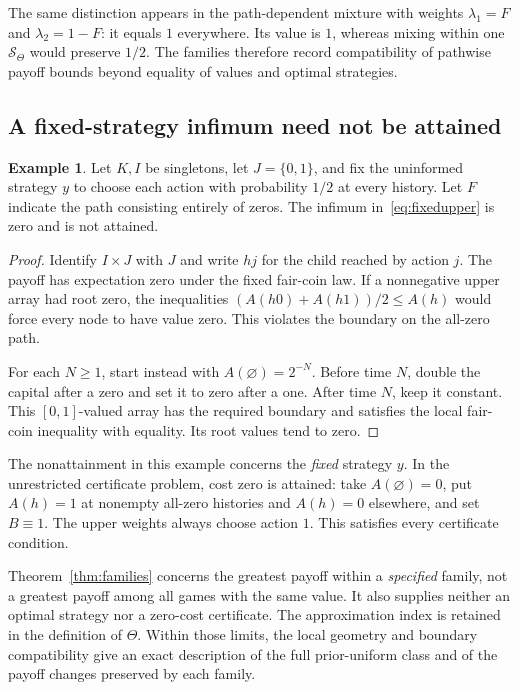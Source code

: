 \documentclass[11pt,a4paper]{article}
\theoremstyle{definition}
\newtheorem{example}[theorem]{Example}
\theoremstyle{remark}
\begin{document}
The same distinction appears in the path-dependent mixture with
weights $\lambda_1=F$ and $\lambda_2=1-F$: it equals $1$ everywhere.
Its value is $1$, whereas mixing within one $\mathcal S_\Theta$
would preserve $1/2$. The families therefore record compatibility
of pathwise payoff bounds beyond equality of values and optimal
strategies.

\subsection{A fixed-strategy infimum need not be attained}

\begin{example}\label{ex:nonattainment}
Let $K,I$ be singletons, let $J=\{0,1\}$, and fix the uninformed
strategy $y$ to choose each action with probability $1/2$ at every
history. Let $F$ indicate the path consisting entirely of zeros.
The infimum in~\eqref{eq:fixedupper} is zero and is not attained.
\end{example}

\begin{proof}
Identify $I\times J$ with $J$ and write $hj$ for the child reached
by action $j$. The payoff has expectation zero under the fixed
fair-coin law. If a
nonnegative upper array had root zero, the inequalities
$(A(h0)+A(h1))/2\leq A(h)$ would force every node to have value zero.
This violates the boundary on the all-zero path.

For each $N\geq1$, start instead with $A(\varnothing)=2^{-N}$.
Before time $N$, double the capital after a zero and set it to zero
after a one. After time $N$, keep it constant. This $[0,1]$-valued
array has the required boundary and satisfies the local fair-coin
inequality with equality. Its root values tend to zero.
\end{proof}

The nonattainment in this example concerns the \emph{fixed} strategy
$y$. In the unrestricted certificate problem, cost zero is attained:
take $A(\varnothing)=0$, put $A(h)=1$ at nonempty all-zero histories
and $A(h)=0$ elsewhere, and set $B\equiv1$. The upper weights always
choose action $1$. This satisfies every certificate condition.

Theorem~\ref{thm:families} concerns the greatest payoff within a
\emph{specified} family, not a greatest payoff among all games with
the same value. It also supplies neither an optimal strategy nor a
zero-cost certificate. The approximation index is retained in the
definition of $\Theta$. Within those limits, the local geometry and
boundary compatibility give an exact description of the full
prior-uniform class and of the payoff changes preserved by each
family.
\end{document}
